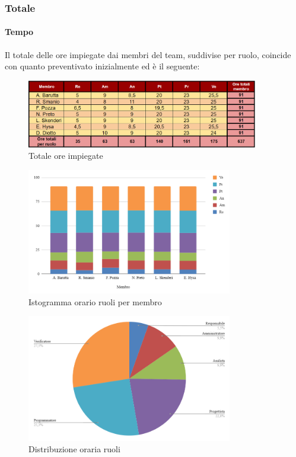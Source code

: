 \subsubsection{Totale}

\paragraph{Tempo}
Il totale delle ore impiegate dai membri del team, suddivise per ruolo, coincide con quanto preventivato inizialmente ed è il seguente:

\begin{figure}[H]
    \centering
    \includegraphics[width=0.9\textwidth]{../Images/riepilogoTotOreMembro.png}
    \caption{Totale ore impiegate}
    \label{fig:Tot_oreRTBPB}
\end{figure}

\vspace{0.6cm}

\begin{figure}[H]
    \centering
    \includegraphics[width=0.8\textwidth]{../Images/graficoOrarioRuoloTot.png}
    \caption{Istogramma orario ruoli per membro}
    \label{fig:GraficoOreRTBPB}
\end{figure}

\begin{figure}[H]
    \centering
    \includegraphics[width=0.8\textwidth]{../Images/distribuzioneOrariaTotRuoli.png}
    \caption{Distribuzione oraria ruoli}
    \label{fig:GraficoDistribuzioneOreRTBPB}
\end{figure}

